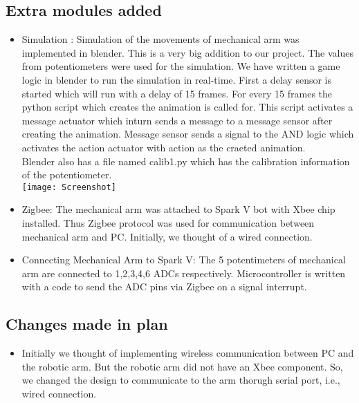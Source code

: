 \documentclass[a4wide]{article}
\begin{document}
\subsection{Extra modules added}
\begin{itemize}
\item Simulation : Simulation of the movements of mechanical arm was implemented in blender. This is a very big addition to our project. The values from potentiometers were used for the simulation. We have written a game logic in blender to run the simulation in real-time. First a delay sensor is started which will run with a delay of 15 frames. For every 15 frames the python script which creates the animation is called for. This script activates a message actuator which inturn sends a message to a message sensor after creating the animation. Message sensor sends a signal to the AND logic which activates the action actuator with action as the craeted animation. \\

Blender also has a file named calib1.py which has the calibration information of the potentiometer.
\\
\texttt{[image: Screenshot]}
\\
\item Zigbee: The mechanical arm was attached to Spark V bot with Xbee chip installed. Thus Zigbee protocol was used for communication between mechanical arm and PC. Initially, we thought of a wired connection. \\
\item Connecting Mechanical Arm to Spark V: The 5 potentimeters of mechanical arm are connected to 1,2,3,4,6 ADCs respectively. Microcontroller is written with a code to send the ADC pins via Zigbee on a signal interrupt.

\end{itemize}
\subsection{Changes made in plan}
\begin{itemize}
\item Initially we thought of implementing wireless communication between PC and the robotic arm. But the robotic arm did not have an Xbee component. So, we changed the design to communicate to the arm thorugh serial port, i.e., wired connection.
\end{itemize}
\newpage
\end{document}
